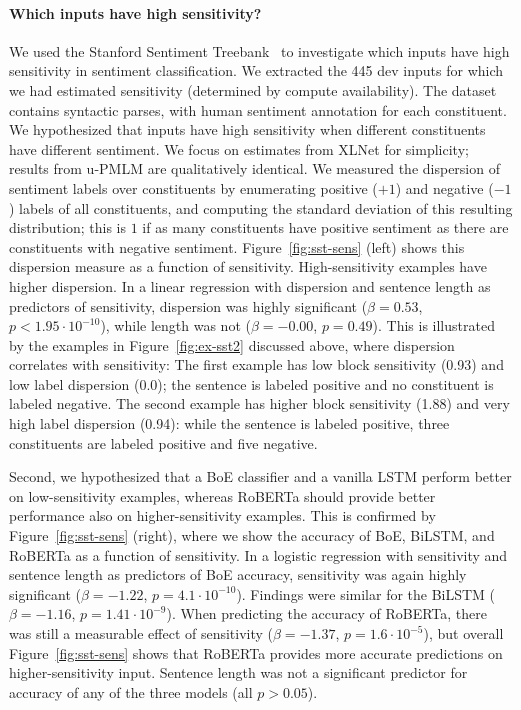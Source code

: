 \documentclass[11pt,a4paper]{article}
\begin{document}
\paragraph{Which inputs have high sensitivity?}
We used the Stanford Sentiment Treebank~\citep[SST-2,][]{socher2013recursive} to investigate which inputs have high sensitivity in sentiment classification.
We extracted the 445 dev inputs for which we had estimated sensitivity (determined by compute availability).
The dataset contains syntactic parses, with human sentiment annotation for each constituent.
We hypothesized that inputs have high sensitivity when different constituents have different sentiment.
We focus on estimates from XLNet for simplicity; results from u-PMLM are qualitatively identical.
We measured the dispersion of sentiment labels over constituents by enumerating positive ($+1$) and negative ($-1$) labels of all constituents, and computing the standard deviation of this resulting distribution; this is $1$ if as many constituents have positive sentiment as there are constituents with negative sentiment.
Figure~\ref{fig:sst-sens} (left) shows this dispersion measure as a function of sensitivity.
High-sensitivity examples have higher dispersion.
In a linear regression with dispersion and sentence length as predictors of sensitivity, dispersion was highly significant ($\beta = 0.53$, $p < 1.95\cdot 10^{-10}$), while length was not ($\beta = -0.00$, $p=0.49$).
This is illustrated by the examples in Figure~\ref{fig:ex-sst2} discussed above, where dispersion correlates with sensitivity:
The first example has low block sensitivity (0.93) and low label dispersion (0.0); the sentence is labeled positive and no constituent is labeled negative.
The second example has higher block sensitivity (1.88) and very high label dispersion (0.94): while the sentence is labeled positive, three constituents are labeled positive and five negative.


Second, we hypothesized that a BoE classifier and a vanilla LSTM perform better on low-sensitivity examples, whereas RoBERTa should provide better performance also on higher-sensitivity examples.
This is confirmed by Figure~\ref{fig:sst-sens} (right), where we show the accuracy of BoE, BiLSTM, and RoBERTa as a function of sensitivity.
In a logistic regression with sensitivity and sentence length as predictors of BoE accuracy, sensitivity was again highly significant ($\beta = -1.22$, $p = 4.1\cdot 10^{-10}$). %
Findings were similar for the BiLSTM ($\beta=-1.16$, $p=1.41\cdot 10^{-9}$). %
When predicting the accuracy of RoBERTa, there was still a measurable effect of sensitivity ($\beta=-1.37$, $p = 1.6\cdot 10^{-5}$), but overall Figure~\ref{fig:sst-sens} shows that RoBERTa provides more accurate predictions on higher-sensitivity input.
Sentence length was not a significant predictor for accuracy of any of the three models (all $p>0.05$).
\end{document}
